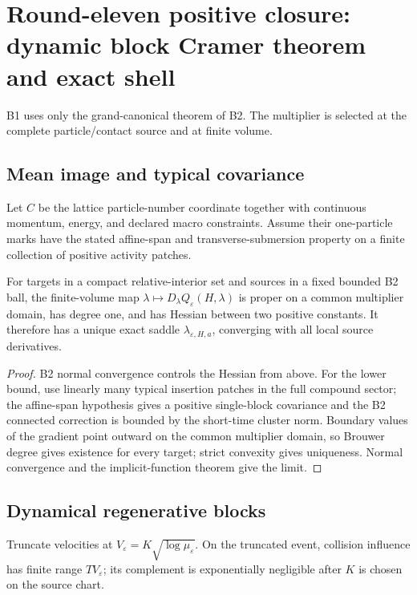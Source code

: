 \section{Round-eleven positive closure: dynamic block Cramer theorem and exact shell}
\label{sec:r11-b1}

B1 uses only the grand-canonical theorem of B2.  The multiplier is selected at
the complete particle/contact source and at finite volume.

\subsection{Mean image and typical covariance}
Let $C$ be the lattice particle-number coordinate together with continuous
momentum, energy, and declared macro constraints.  Assume their one-particle
marks have the stated affine-span and transverse-submersion property on a
finite collection of positive activity patches.

\begin{theorem}
\label{thm:r11-b1-saddle}
For targets in a compact relative-interior set and sources in a fixed bounded
B2 ball, the finite-volume map
$\lambda\mapsto D_\lambda Q_\varepsilon(H,\lambda)$ is proper on a common
multiplier domain, has degree one, and has Hessian between two positive
constants.  It therefore has a unique exact saddle
$\lambda_{\varepsilon,H,a}$, converging with all local source derivatives.
\end{theorem}

\begin{proof}
B2 normal convergence controls the Hessian from above.  For the lower bound,
use linearly many typical insertion patches in the full compound sector; the
affine-span hypothesis gives a positive single-block covariance and the B2
connected correction is bounded by the short-time cluster norm.  Boundary
values of the gradient point outward on the common multiplier domain, so
Brouwer degree gives existence for every target; strict convexity gives
uniqueness.  Normal convergence and the implicit-function theorem give the
limit.
\end{proof}

\subsection{Dynamical regenerative blocks}
Truncate velocities at
$V_\varepsilon=K\sqrt{\log\mu_\varepsilon}$.  On the truncated event,
collision influence has finite range $TV_\varepsilon$; its complement is
exponentially negligible after $K$ is chosen on the source chart.

